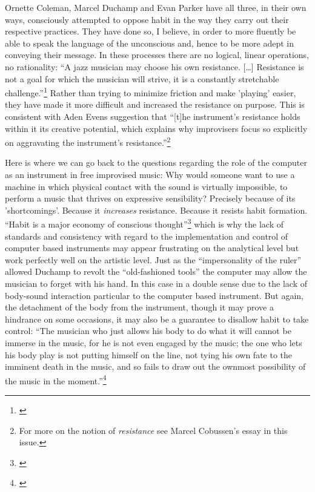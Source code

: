 Ornette Coleman, Marcel Duchamp and Evan Parker have all three, in
their own ways, consciously attempted to oppose habit in the way they
carry out their respective practices. They have done so, I believe, in
order to more fluently be able to speak the language of the
unconscious and, hence to be more adept in conveying their message. In
these processes there are no logical, linear operations, no
rationality: ``A jazz musician may choose his own resistance. [\ldots]
Resistance is not a goal for which the musician will strive, it is a
constantly stretchable challenge.''\footnote{\citet[My
translation][p. 8]{glanzelius67}} Rather than trying to minimize friction
and make 'playing' easier, they have made it more difficult and
increased the resistance on purpose. This is consistent with Aden
Evens suggestion that ``[t]he instrument's resistance holds within it
its creative potential, which explains why improvisers focus so
explicitly on aggravating the instrument's
resistance.''\footnote{\citet[p. 162]{evens05} For more on the notion of
  \emph{resistance} see Marcel Cobussen's essay in this issue.}

Here is where we can go back to the questions regarding the role of
the computer as an instrument in free improvised music: Why would
someone want to use a machine in which physical contact with the sound
is virtually impossible, to perform a music that thrives on expressive
sensibility? Precisely because of its 'shortcomings'. Because it
\emph{increases} resistance. Because it resists habit
formation. ``Habit is a major economy of conscious
thought''\footnote{\citet[p. 141]{bateson72}} which is why the lack of standards
and consistency with regard to the implementation and control of
computer based instruments may appear frustrating on the analytical
level but work perfectly well on the artistic level. Just as the
``impersonality of the ruler'' allowed Duchamp to revolt the
``old-fashioned tools'' the computer may allow the musician to forget
with his hand. In this case in a double sense due to the lack of
body-sound interaction particular to the computer based
instrument. But again, the detachment of the body from the instrument,
though it may prove a hindrance on some occasions, it may also be a
guarantee to disallow habit to take control: ``The musician who just
allows his body to do what it will cannot be immerse in the music, for
he is not even engaged by the music; the one who lets his body play is
not putting himself on the line, not tying his own fate to the
imminent death in the music, and so fails to draw out the ownmost
possibility of the music in the moment.''\footnote{\citet[p. 143]{evens05}}


